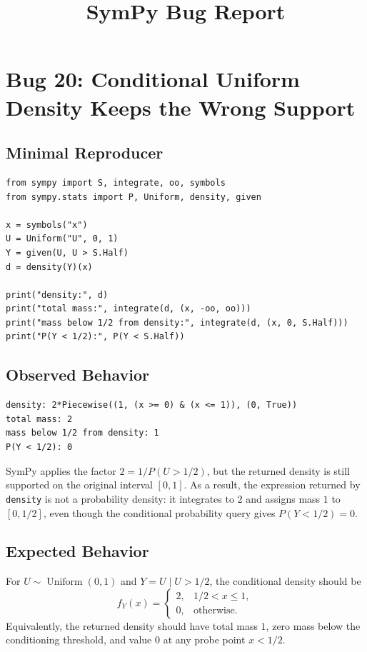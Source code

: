 \documentclass[11pt]{article}
\title{SymPy Bug Report}
\author{}
\date{}
\begin{document}
\maketitle

\section{Bug 20: Conditional Uniform Density Keeps the Wrong Support}

\subsection{Minimal Reproducer}

\medskip

\begin{lstlisting}[style=bugpython]
from sympy import S, integrate, oo, symbols
from sympy.stats import P, Uniform, density, given

x = symbols("x")
U = Uniform("U", 0, 1)
Y = given(U, U > S.Half)
d = density(Y)(x)

print("density:", d)
print("total mass:", integrate(d, (x, -oo, oo)))
print("mass below 1/2 from density:", integrate(d, (x, 0, S.Half)))
print("P(Y < 1/2):", P(Y < S.Half))
\end{lstlisting}

\subsection{Observed Behavior}

\medskip

\begin{lstlisting}[style=bugpython]
density: 2*Piecewise((1, (x >= 0) & (x <= 1)), (0, True))
total mass: 2
mass below 1/2 from density: 1
P(Y < 1/2): 0
\end{lstlisting}

SymPy applies the factor \(2 = 1/P(U > 1/2)\), but the returned density is
still supported on the original interval \([0,1]\).  As a result, the expression
returned by \texttt{density} is not a probability density: it integrates to
\(2\) and assigns mass \(1\) to \([0,1/2]\), even though the conditional
probability query gives \(P(Y < 1/2)=0\).

\subsection{Expected Behavior}

For \(U \sim \operatorname{Uniform}(0,1)\) and \(Y = U \mid U > 1/2\), the
conditional density should be
\[
f_Y(x) =
\begin{cases}
2, & 1/2 < x \le 1,\\
0, & \text{otherwise}.
\end{cases}
\]
Equivalently, the returned density should have total mass \(1\), zero mass below
the conditioning threshold, and value \(0\) at any probe point \(x<1/2\).
\end{document}
